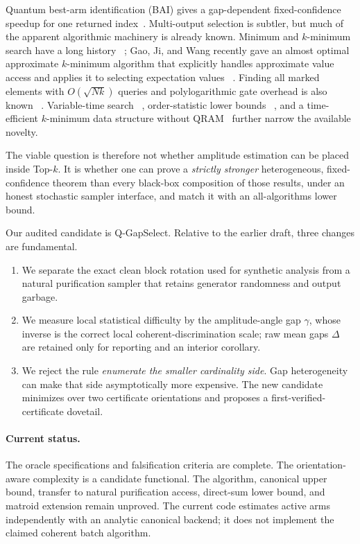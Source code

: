 \documentclass[10pt]{article}
\theoremstyle{definition}
\begin{document}
Quantum best-arm identification (BAI) gives a gap-dependent fixed-confidence
speedup for one returned index~\cite{wang2021quantum}.  Multi-output selection is
subtler, but much of the apparent algorithmic machinery is already known.
Minimum and $k$-minimum search have a long history
~\cite{durr1996minimum,durr2006graph,miyamoto2019kminima}; Gao, Ji, and Wang
recently gave an almost optimal approximate $k$-minimum algorithm that explicitly
handles approximate value access and applies it to selecting expectation values
~\cite{gao2025approxkmin}.  Finding all marked elements with
$O(\sqrt{Nk})$ queries and polylogarithmic gate overhead is also known
~\cite{vanapeldoorn2024marked}.  Variable-time search
~\cite{ambainis2023variable}, order-statistic lower bounds
~\cite{nayak1999median}, and a time-efficient $k$-minimum data structure without
QRAM~\cite{wang2026rmq} further narrow the available novelty.

The viable question is therefore not whether amplitude estimation can be placed
inside Top-$k$.  It is whether one can prove a \emph{strictly stronger}
heterogeneous, fixed-confidence theorem than every black-box composition of those
results, under an honest stochastic sampler interface, and match it with an
all-algorithms lower bound.

Our audited candidate is Q-GapSelect.  Relative to the earlier draft, three
changes are fundamental.
\begin{enumerate}[leftmargin=*]
  \item We separate the exact clean block rotation used for synthetic analysis
  from a natural purification sampler that retains generator randomness and
  output garbage.
  \item We measure local statistical difficulty by the amplitude-angle gap
  $\gamma$, whose inverse is the correct local coherent-discrimination scale;
  raw mean gaps $\Delta$ are retained only for reporting and an interior
  corollary.
  \item We reject the rule \emph{enumerate the smaller cardinality side}.  Gap
  heterogeneity can make that side asymptotically more expensive.  The new
  candidate minimizes over two certificate orientations and proposes a
  first-verified-certificate dovetail.
\end{enumerate}

\paragraph{Current status.}
The oracle specifications and falsification criteria are complete.  The
orientation-aware complexity is a candidate functional.  The algorithm,
canonical upper bound, transfer to natural purification access, direct-sum lower
bound, and matroid extension remain unproved.  The current code estimates active
arms independently with an analytic canonical backend; it does not implement the
claimed coherent batch algorithm.
\end{document}

